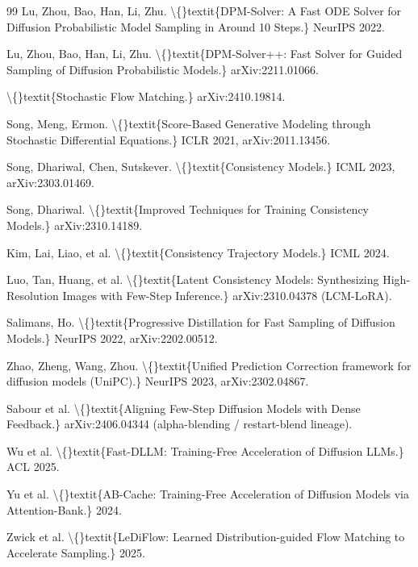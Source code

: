 \documentclass[preprint,3p,times,twocolumn]{elsarticle}
\begin{document}
\begin{thebibliography}{99}
 Lu, Zhou, Bao, Han, Li, Zhu. \textbackslash\{\}textit\{DPM-Solver: A Fast ODE Solver for Diffusion Probabilistic Model Sampling in Around 10 Steps.\} NeurIPS 2022.

 Lu, Zhou, Bao, Han, Li, Zhu. \textbackslash\{\}textit\{DPM-Solver++: Fast Solver for Guided Sampling of Diffusion Probabilistic Models.\} arXiv:2211.01066.

 \textbackslash\{\}textit\{Stochastic Flow Matching.\} arXiv:2410.19814.

 Song, Meng, Ermon. \textbackslash\{\}textit\{Score-Based Generative Modeling through Stochastic Differential Equations.\} ICLR 2021, arXiv:2011.13456.

 Song, Dhariwal, Chen, Sutskever. \textbackslash\{\}textit\{Consistency Models.\} ICML 2023, arXiv:2303.01469.

 Song, Dhariwal. \textbackslash\{\}textit\{Improved Techniques for Training Consistency Models.\} arXiv:2310.14189.

 Kim, Lai, Liao, et al. \textbackslash\{\}textit\{Consistency Trajectory Models.\} ICML 2024.

 Luo, Tan, Huang, et al. \textbackslash\{\}textit\{Latent Consistency Models: Synthesizing High-Resolution Images with Few-Step Inference.\} arXiv:2310.04378 (LCM-LoRA).

 Salimans, Ho. \textbackslash\{\}textit\{Progressive Distillation for Fast Sampling of Diffusion Models.\} NeurIPS 2022, arXiv:2202.00512.

 Zhao, Zheng, Wang, Zhou. \textbackslash\{\}textit\{Unified Prediction Correction framework for diffusion models (UniPC).\} NeurIPS 2023, arXiv:2302.04867.

 Sabour et al. \textbackslash\{\}textit\{Aligning Few-Step Diffusion Models with Dense Feedback.\} arXiv:2406.04344 (alpha-blending / restart-blend lineage).

 Wu et al. \textbackslash\{\}textit\{Fast-DLLM: Training-Free Acceleration of Diffusion LLMs.\} ACL 2025.

 Yu et al. \textbackslash\{\}textit\{AB-Cache: Training-Free Acceleration of Diffusion Models via Attention-Bank.\} 2024.

 Zwick et al. \textbackslash\{\}textit\{LeDiFlow: Learned Distribution-guided Flow Matching to Accelerate Sampling.\} 2025.


\end{thebibliography}
\end{document}
